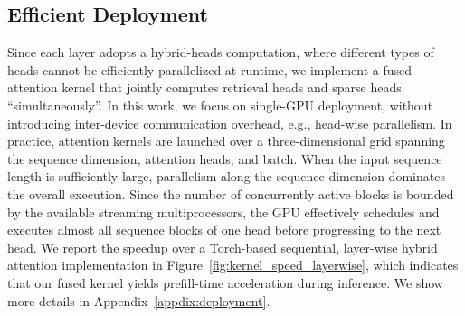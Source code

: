 \subsection{Efficient Deployment}
\label{subsec:deployment_of_attn_router}
Since each layer adopts a hybrid-heads computation, where different types of heads cannot be efficiently parallelized at runtime, we implement a fused attention kernel that jointly computes retrieval heads and sparse heads ``simultaneously''.
In this work, we focus on single-GPU deployment, without introducing inter-device communication overhead, e.g., head-wise parallelism.
In practice, attention kernels are launched over a three-dimensional grid spanning the sequence dimension, attention heads, and batch.
When the input sequence length is sufficiently large, parallelism along the sequence dimension dominates the overall execution. 
Since the number of concurrently active blocks is bounded by the available streaming multiprocessors, the GPU effectively schedules and executes almost all sequence blocks of one head before progressing to the next head.
We report the speedup over a Torch-based sequential, layer-wise hybrid attention implementation in Figure~\ref{fig:kernel_speed_layerwise}, which indicates that our fused kernel yields prefill-time acceleration during inference.
We show more details in Appendix~\ref{appdix:deployment}.

